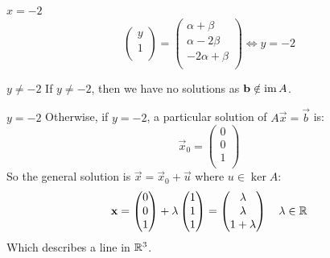 \documentclass[../main.tex]{subfiles}
\begin{document}
\begin{example}
\begin{proofcases}
\begin{case}{$x = -2$}
\[\begin{pmatrix}
        y \\
        1 \\
        \end{pmatrix}=
        \begin{pmatrix}
        \alpha + \beta \\
        \alpha - 2\beta \\
        -2\alpha + \beta \\
        \end{pmatrix}
        \iff y = -2
      \]
      \begin{proofcases}
        \begin{case}{$y \neq -2$}
          If $y \neq -2$, then we have no solutions as $\mathbf{\bm{b}} \notin \operatorname{im} A$.
        \end{case}
        \begin{case}{$y = -2$}
          Otherwise, if $y = -2$, a particular solution of $A\vec{x} = \vec{b}$ is:
          \[
            \vec{x}_0 = \begin{pmatrix}
            0 \\
            0 \\
            1 \\
            \end{pmatrix}
          \]
          So the general solution is $\vec{x} = \vec{x}_0 + \vec{u}$ where $u \in \ker A$:
          \[
            \mathbf{\bm{x}} = \begin{pmatrix}
            0 \\
            0 \\
            1 \\
            \end{pmatrix} +
            \lambda \begin{pmatrix}
            1 \\
            1 \\
            1 \\
            \end{pmatrix}=
            \begin{pmatrix}
            \lambda \\
            \lambda \\
            1 + \lambda \\
            \end{pmatrix} \quad \lambda \in \mathbb{R}
          \]
          Which describes a line in $\mathbb{R}^3$.
        \end{case}
      \end{proofcases}
    \end{case}
  \end{proofcases}
\end{example}
\end{document}
